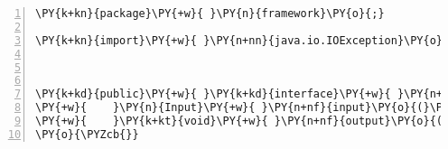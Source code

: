 \begin{Verbatim}[commandchars=\\\{\},numbers=left,firstnumber=1,stepnumber=1,frame=single,fontsize=\small]
\PY{k+kn}{package}\PY{+w}{ }\PY{n}{framework}\PY{o}{;}

\PY{k+kn}{import}\PY{+w}{ }\PY{n+nn}{java.io.IOException}\PY{o}{;}



\PY{k+kd}{public}\PY{+w}{ }\PY{k+kd}{interface}\PY{+w}{ }\PY{n+nc}{InputAndOutput}\PY{+w}{ }\PY{o}{\PYZob{}}
\PY{+w}{    }\PY{n}{Input}\PY{+w}{ }\PY{n+nf}{input}\PY{o}{(}\PY{o}{)}\PY{+w}{ }\PY{k+kd}{throws}\PY{+w}{ }\PY{n}{IOException}\PY{o}{;}
\PY{+w}{    }\PY{k+kt}{void}\PY{+w}{ }\PY{n+nf}{output}\PY{o}{(}\PY{n}{Output}\PY{+w}{ }\PY{n}{output}\PY{o}{)}\PY{o}{;}
\PY{o}{\PYZcb{}}
\end{Verbatim}
